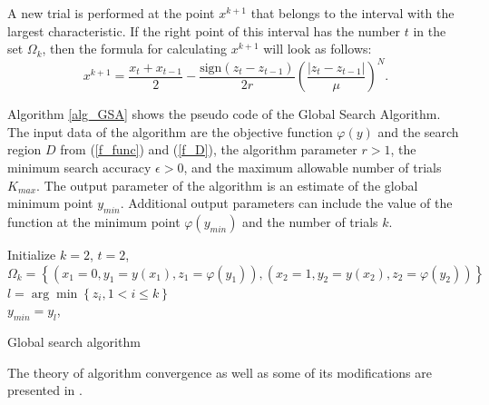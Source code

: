 \documentclass[preprint,12pt]{elsarticle}
\begin{document}
A new trial is performed at the point $x^{k+1}$ that belongs to the interval
with the largest characteristic. If the right point of this interval has the number $t$ in the set $\Omega_k$, then the formula for calculating $x^{k+1}$ will look as follows:
\begin{equation}\label{xk1}
x^{k+1} = \frac{x_t+x_{t-1}}{2}- \frac{\mathrm{sign}(z_t-z_{t-1})}{2r} \left(\frac{\left|z_t-z_{t-1}\right|}{\mu}\right)^N.   
\end{equation}

Algorithm \ref{alg_GSA} shows the pseudo code of the Global Search Algorithm. The input data of the algorithm are the objective function $\varphi(y)$ and the search region $D$ from (\ref{f_func}) and (\ref{f_D}), the algorithm parameter $r>1$, the minimum search accuracy $\epsilon > 0$, and the maximum allowable number of trials $K_{max}$. The output parameter of the algorithm is an estimate of the global minimum point $y_{min}$. Additional output parameters can include the value of the function at the minimum point $\varphi(y_{min})$ and the number of trials $k$.

\begin{algorithm}
\LinesNumbered
 Initialize $k=2$, $t=2$, $\Omega_k= \left\{ (x_1=0, y_1=y(x_1), z_1=\varphi(y_1)), (x_2=1, y_2=y(x_2), z_2=\varphi(y_2)) \right\}$\\
 $l = \arg \min \left\{ z_i, 1 < i \leq k \right\}$\\
 $y_{min} = y_l$, \\ 
 \caption{Global search algorithm}\label{alg_GSA}
\end{algorithm}

The theory of algorithm convergence as well as some of its modifications are presented in \cite{Strongin2000}.
\end{document}

